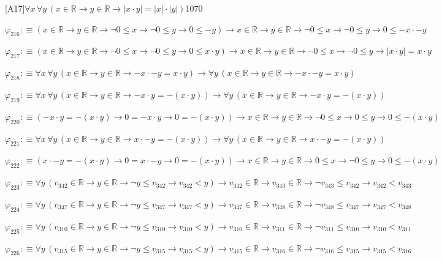 \begin{fullproof}{[A17]}{$\forall x\,\forall y\,(x \in \mathbb{R} \to y \in \mathbb{R} \to \lvert x \cdot y \rvert = \lvert x \rvert \cdot \lvert y \rvert)$}{1070}
\begin{abbrevlist}
\item $\varphi_{216} :\equiv (x \in \mathbb{R} \to y \in \mathbb{R} \to \neg 0 \leq x \to \neg 0 \leq y \to 0 \leq -y) \to x \in \mathbb{R} \to y \in \mathbb{R} \to \neg 0 \leq x \to \neg 0 \leq y \to 0 \leq -x \cdot -y$
\item $\varphi_{217} :\equiv (x \in \mathbb{R} \to y \in \mathbb{R} \to \neg 0 \leq x \to \neg 0 \leq y \to 0 \leq x \cdot y) \to x \in \mathbb{R} \to y \in \mathbb{R} \to \neg 0 \leq x \to \neg 0 \leq y \to \lvert x \cdot y \rvert = x \cdot y$
\item $\varphi_{218} :\equiv \forall x\,\forall y\,(x \in \mathbb{R} \to y \in \mathbb{R} \to -x \cdot -y = x \cdot y) \to \forall y\,(x \in \mathbb{R} \to y \in \mathbb{R} \to -x \cdot -y = x \cdot y)$
\item $\varphi_{219} :\equiv \forall x\,\forall y\,(x \in \mathbb{R} \to y \in \mathbb{R} \to -x \cdot y = -(x \cdot y)) \to \forall y\,(x \in \mathbb{R} \to y \in \mathbb{R} \to -x \cdot y = -(x \cdot y))$
\item $\varphi_{220} :\equiv (-x \cdot y = -(x \cdot y) \to 0 = -x \cdot y \to 0 = -(x \cdot y)) \to x \in \mathbb{R} \to y \in \mathbb{R} \to \neg 0 \leq x \to 0 \leq y \to 0 \leq -(x \cdot y)$
\item $\varphi_{221} :\equiv \forall x\,\forall y\,(x \in \mathbb{R} \to y \in \mathbb{R} \to x \cdot -y = -(x \cdot y)) \to \forall y\,(x \in \mathbb{R} \to y \in \mathbb{R} \to x \cdot -y = -(x \cdot y))$
\item $\varphi_{222} :\equiv (x \cdot -y = -(x \cdot y) \to 0 = x \cdot -y \to 0 = -(x \cdot y)) \to x \in \mathbb{R} \to y \in \mathbb{R} \to 0 \leq x \to \neg 0 \leq y \to 0 \leq -(x \cdot y)$
\item $\varphi_{223} :\equiv \forall y\,(v_{342} \in \mathbb{R} \to y \in \mathbb{R} \to \neg y \leq v_{342} \to v_{342} < y) \to v_{342} \in \mathbb{R} \to v_{343} \in \mathbb{R} \to \neg v_{343} \leq v_{342} \to v_{342} < v_{343}$
\item $\varphi_{224} :\equiv \forall y\,(v_{347} \in \mathbb{R} \to y \in \mathbb{R} \to \neg y \leq v_{347} \to v_{347} < y) \to v_{347} \in \mathbb{R} \to v_{348} \in \mathbb{R} \to \neg v_{348} \leq v_{347} \to v_{347} < v_{348}$
\item $\varphi_{225} :\equiv \forall y\,(v_{310} \in \mathbb{R} \to y \in \mathbb{R} \to \neg y \leq v_{310} \to v_{310} < y) \to v_{310} \in \mathbb{R} \to v_{311} \in \mathbb{R} \to \neg v_{311} \leq v_{310} \to v_{310} < v_{311}$
\item $\varphi_{226} :\equiv \forall y\,(v_{315} \in \mathbb{R} \to y \in \mathbb{R} \to \neg y \leq v_{315} \to v_{315} < y) \to v_{315} \in \mathbb{R} \to v_{316} \in \mathbb{R} \to \neg v_{316} \leq v_{315} \to v_{315} < v_{316}$

\end{abbrevlist}
\end{fullproof}
